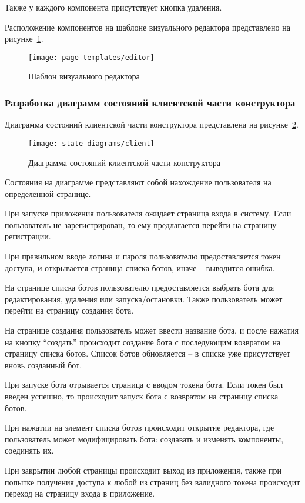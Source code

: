 Также у каждого компонента присутствует кнопка удаления.

Расположение компонентов на шаблоне визуального редактора
представлено на рисунке~\ref{f:editor-template}.

\begin{figure}[ht]
	\centering
	\vspace{0.5cm}
	\texttt{[image: page-templates/editor]}
	\caption{Шаблон визуального редактора}
	\label{f:editor-template}
\end{figure}

\subsubsection{Разработка диаграмм состояний клиентской части конструктора}

Диаграмма состояний клиентской части конструктора представлена на
рисунке~\ref{f:client-state-diagram}.

\begin{figure}[ht]
	\centering
	\vspace{0.5cm}
	\texttt{[image: state-diagrams/client]}
	\caption{Диаграмма состояний клиентской части конструктора}
	\label{f:client-state-diagram}
\end{figure}

Состояния на диаграмме представляют собой нахождение пользователя
на определенной странице.

При запуске приложения пользователя ожидает страница входа в
систему. Если пользователь не зарегистрирован, то ему предлагается перейти
на страницу регистрации.

При правильном вводе логина и пароля пользователю предоставляется
токен доступа, и открывается страница списка ботов, иначе – выводится
ошибка.

На странице списка ботов пользователю предоставляется выбрать бота
для редактирования, удаления или запуска/остановки. Также пользователь
может перейти на страницу создания бота.

На странице создания пользователь может ввести название бота, и после
нажатия на кнопку “создать” происходит создание бота с последующим
возвратом на страницу списка ботов. Список ботов обновляется – в списке уже
присутствует вновь созданный бот.

При запуске бота отрывается страница с вводом токена бота. Если токен
был введен успешно, то происходит запуск бота с возвратом на страницу
списка ботов.

При нажатии на элемент списка ботов происходит открытие редактора,
где пользователь может модифицировать бота: создавать и изменять
компоненты, соединять их.

При закрытии любой страницы происходит выход из приложения, также
при попытке получения доступа к любой из страниц без валидного токена
происходит переход на страницу входа в приложение.



